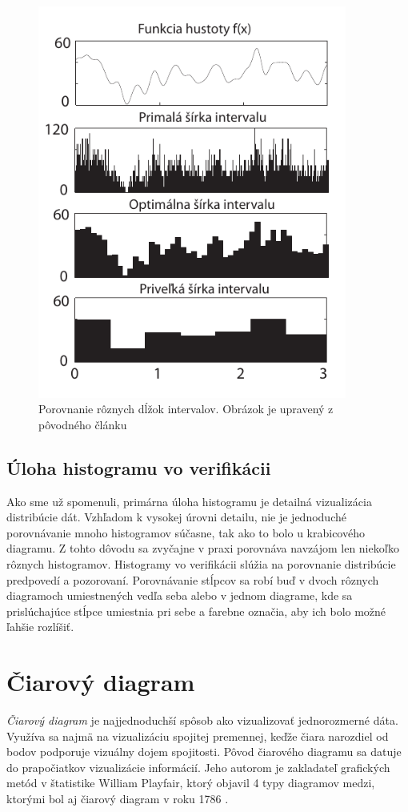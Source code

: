 \begin{figure}
	\centering
	\includegraphics[width = 4in]{binsizehistogram}
	\caption{ Porovnanie rôznych dĺžok intervalov. Obrázok je upravený z pôvodného článku \cite{OptBinSize} }
	\label{fig:binsizehistogram}
\end{figure}

 
\subsection{Úloha histogramu vo verifikácii}
Ako sme už spomenuli, primárna úloha histogramu je detailná vizualizácia distribúcie dát. Vzhľadom k vysokej úrovni detailu, nie je jednoduché porovnávanie mnoho histogramov súčasne, tak ako to bolo u krabicového diagramu. Z tohto dôvodu sa zvyčajne v praxi porovnáva navzájom len niekoľko rôznych histogramov. Histogramy vo verifikácii slúžia na porovnanie distribúcie predpovedí a pozorovaní. Porovnávanie stĺpcov sa robí buď v dvoch rôznych diagramoch umiestnených vedľa seba alebo v jednom diagrame, kde sa prislúchajúce stĺpce umiestnia pri sebe a farebne označia, aby ich bolo možné ľahšie rozlíšiť.

\section{Čiarový diagram}
\textit{Čiarový diagram} je najjednoduchší spôsob ako vizualizovať jednorozmerné dáta. Využíva sa najmä na vizualizáciu spojitej premennej, keďže čiara narozdiel od bodov podporuje vizuálny dojem spojitosti. Pôvod čiarového diagramu sa datuje do prapočiatkov vizualizácie informácií. Jeho autorom je zakladateľ grafických metód v štatistike William Playfair, ktorý objavil 4 typy diagramov medzi, ktorými bol aj čiarový diagram v roku 1786 \cite{HistoryOfInfoVis}.

